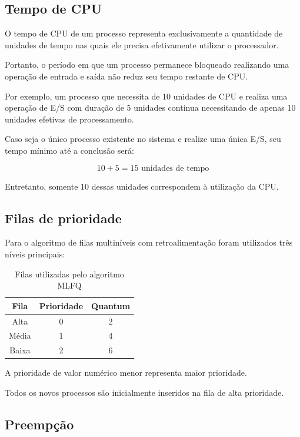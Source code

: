 \documentclass[12pt,a4paper]{article}
\begin{document}
\subsection{Tempo de CPU}

O tempo de CPU de um processo representa exclusivamente a quantidade
de unidades de tempo nas quais ele precisa efetivamente utilizar o
processador.

Portanto, o período em que um processo permanece bloqueado realizando
uma operação de entrada e saída não reduz seu tempo restante de CPU.

Por exemplo, um processo que necessita de 10 unidades de CPU e
realiza uma operação de E/S com duração de 5 unidades continua
necessitando de apenas 10 unidades efetivas de processamento.

Caso seja o único processo existente no sistema e realize uma única
E/S, seu tempo mínimo até a conclusão será:

\[
10 + 5 = 15 \text{ unidades de tempo}
\]

Entretanto, somente 10 dessas unidades correspondem à utilização da
CPU.

\subsection{Filas de prioridade}

Para o algoritmo de filas multiníveis com retroalimentação foram
utilizados três níveis principais:

\begin{table}[H]
    \centering
    \caption{Filas utilizadas pelo algoritmo MLFQ}
    \begin{tabular}{ccc}
        \toprule
        \textbf{Fila} &
        \textbf{Prioridade} &
        \textbf{Quantum} \\
        \midrule
        Alta  & 0 & 2 \\
        Média & 1 & 4 \\
        Baixa & 2 & 6 \\
        \bottomrule
    \end{tabular}
\end{table}

A prioridade de valor numérico menor representa maior prioridade.

Todos os novos processos são inicialmente inseridos na fila de alta
prioridade.

\subsection{Preempção}
\end{document}
